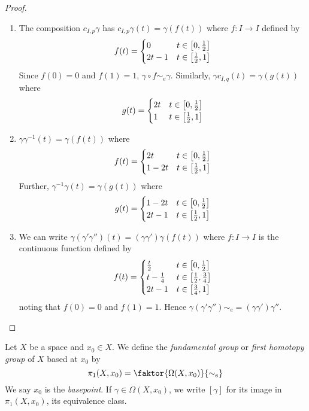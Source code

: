 \begin{proof}
	\begin{enumerate}
		\item The composition \( c_{I,p} \gamma \) has \( c_{I,p} \gamma (t) = \gamma(f(t)) \) where \( f \colon I \to I \) defined by
			\[ f(t) = \begin{cases}
				0 & t \in \qty[0,\frac 12] \\
				2t - 1 & t \in \qty[\frac 12, 1]
			\end{cases} \]
			Since \( f(0) = 0 \) and \( f(1) = 1 \), \( \gamma \circ f \sim_e \gamma \).
			Similarly, \( \gamma c_{I,q} (t) = \gamma(g(t)) \) where
			\[ g(t) = \begin{cases}
				2t & t \in \qty[0,\frac 12] \\
				1 & t \in \qty[\frac 12, 1]
			\end{cases} \]
		\item \( \gamma\gamma^{-1}(t) = \gamma(f(t)) \) where
			\[ f(t) = \begin{cases}
				2t & t \in \qty[0,\frac 12] \\
				1 - 2t & t \in \qty[\frac 12, 1]
			\end{cases} \]
			Further, \( \gamma^{-1}\gamma(t) = \gamma(g(t)) \) where
			\[ g(t) = \begin{cases}
				1 - 2t & t \in \qty[0,\frac 12] \\
				2t - 1 & t \in \qty[\frac 12, 1]
			\end{cases} \]
		\item We can write \( \gamma(\gamma'\gamma'')(t) = (\gamma\gamma')\gamma(f(t)) \) where \( f \colon I \to I \) is the continuous function defined by
			\[ f(t) = \begin{cases}
				\frac t2 & t \in \qty[0,\frac 12] \\
				t - \frac 14 & t \in \qty[\frac 12, \frac 34] \\
				2t - 1 & t \in \qty[\frac 34, 1]
			\end{cases} \]
			noting that \( f(0) = 0 \) and \( f(1) = 1 \).
			Hence \( \gamma(\gamma'\gamma'') \sim_e = (\gamma\gamma')\gamma'' \).
	\end{enumerate}
\end{proof}
\begin{definition}
	Let \( X \) be a space and \( x_0 \in X \).
	We define the \emph{fundamental group} or \emph{first homotopy group} of \( X \) based at \( x_0 \) by
	\[ \pi_1(X,x_0) = \faktor{\Omega(X,x_0)}{\sim_e} \]
	We say \( x_0 \) is the \emph{basepoint}.
	If \( \gamma \in \Omega(X,x_0) \), we write \( [\gamma] \) for its image in \( \pi_1(X,x_0) \), its equivalence class.
\end{definition}
